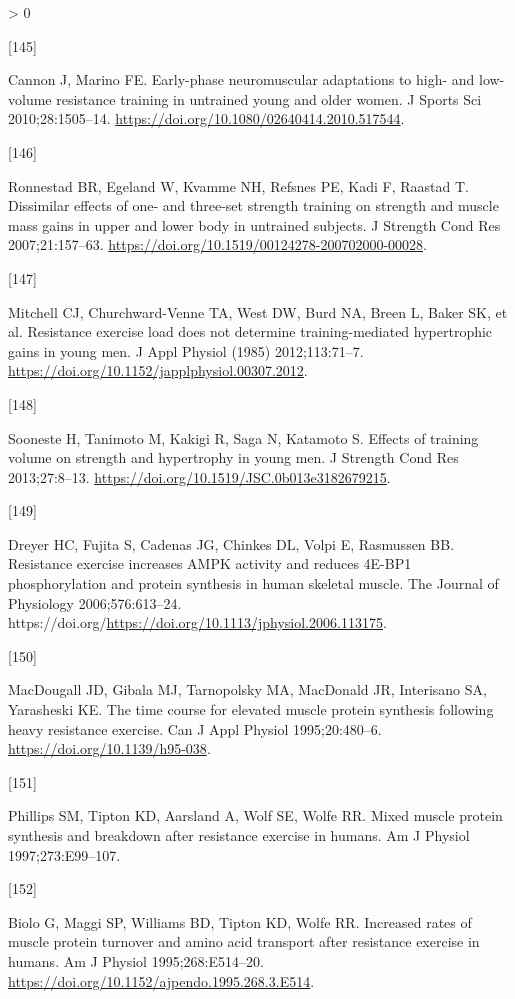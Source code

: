 \documentclass[twoside,10pt]{gihclass} %
\newlength{\cslhangindent}
\newlength{\csllabelwidth}
\newenvironment{CSLReferences}[3] %
 {%
  \setlength{\parindent}{0pt}
  \ifodd #1 \everypar{\setlength{\hangindent}{\cslhangindent}}\ignorespaces\fi
  \ifnum #2 > 0
  \setlength{\parskip}{#2\baselineskip}
  \fi
 }%
 {}
\newcommand{\CSLLeftMargin}[1]{\parbox[t]{\maxof{\widthof{#1}}{\csllabelwidth}}{#1}}
\newcommand{\CSLRightInline}[1]{\parbox[t]{\linewidth}{#1}}
\begin{document}
\begin{CSLReferences}{0}{0}
\leavevmode\hypertarget{ref-RN1382}{}%
\CSLLeftMargin{{[}145{]} }
\CSLRightInline{Cannon J, Marino FE. Early-phase neuromuscular adaptations to high- and low-volume resistance training in untrained young and older women. J Sports Sci 2010;28:1505--14. \url{https://doi.org/10.1080/02640414.2010.517544}.}

\leavevmode\hypertarget{ref-RN776}{}%
\CSLLeftMargin{{[}146{]} }
\CSLRightInline{Ronnestad BR, Egeland W, Kvamme NH, Refsnes PE, Kadi F, Raastad T. Dissimilar effects of one- and three-set strength training on strength and muscle mass gains in upper and lower body in untrained subjects. J Strength Cond Res 2007;21:157--63. \url{https://doi.org/10.1519/00124278-200702000-00028}.}

\leavevmode\hypertarget{ref-RN834}{}%
\CSLLeftMargin{{[}147{]} }
\CSLRightInline{Mitchell CJ, Churchward-Venne TA, West DW, Burd NA, Breen L, Baker SK, et al. Resistance exercise load does not determine training-mediated hypertrophic gains in young men. J Appl Physiol (1985) 2012;113:71--7. \url{https://doi.org/10.1152/japplphysiol.00307.2012}.}

\leavevmode\hypertarget{ref-RN1607}{}%
\CSLLeftMargin{{[}148{]} }
\CSLRightInline{Sooneste H, Tanimoto M, Kakigi R, Saga N, Katamoto S. Effects of training volume on strength and hypertrophy in young men. J Strength Cond Res 2013;27:8--13. \url{https://doi.org/10.1519/JSC.0b013e3182679215}.}

\leavevmode\hypertarget{ref-RN2710}{}%
\CSLLeftMargin{{[}149{]} }
\CSLRightInline{Dreyer HC, Fujita S, Cadenas JG, Chinkes DL, Volpi E, Rasmussen BB. Resistance exercise increases AMPK activity and reduces 4E-BP1 phosphorylation and protein synthesis in human skeletal muscle. The Journal of Physiology 2006;576:613--24. https://doi.org/\url{https://doi.org/10.1113/jphysiol.2006.113175}.}

\leavevmode\hypertarget{ref-RN2711}{}%
\CSLLeftMargin{{[}150{]} }
\CSLRightInline{MacDougall JD, Gibala MJ, Tarnopolsky MA, MacDonald JR, Interisano SA, Yarasheski KE. The time course for elevated muscle protein synthesis following heavy resistance exercise. Can J Appl Physiol 1995;20:480--6. \url{https://doi.org/10.1139/h95-038}.}

\leavevmode\hypertarget{ref-RN786}{}%
\CSLLeftMargin{{[}151{]} }
\CSLRightInline{Phillips SM, Tipton KD, Aarsland A, Wolf SE, Wolfe RR. Mixed muscle protein synthesis and breakdown after resistance exercise in humans. Am J Physiol 1997;273:E99--107.}

\leavevmode\hypertarget{ref-RN2712}{}%
\CSLLeftMargin{{[}152{]} }
\CSLRightInline{Biolo G, Maggi SP, Williams BD, Tipton KD, Wolfe RR. Increased rates of muscle protein turnover and amino acid transport after resistance exercise in humans. Am J Physiol 1995;268:E514--20. \url{https://doi.org/10.1152/ajpendo.1995.268.3.E514}.}


\end{CSLReferences}
\end{document}
